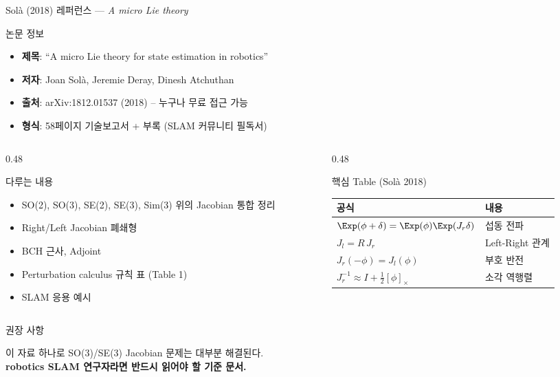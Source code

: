 \begin{frame}[shrink=25]{Solà (2018) 레퍼런스 --- \textit{A micro Lie theory}}
  \begin{block}{논문 정보}
    \begin{itemize}
      \item \textbf{제목}: ``A micro Lie theory for state estimation in robotics''
      \item \textbf{저자}: Joan Solà, Jeremie Deray, Dinesh Atchuthan
      \item \textbf{출처}: arXiv:1812.01537 (2018)  -- 누구나 무료 접근 가능
      \item \textbf{형식}: 58페이지 기술보고서 + 부록 (SLAM 커뮤니티 필독서)
    \end{itemize}
  \end{block}
  \pause
  \begin{columns}[T]
    \begin{column}{0.48\textwidth}
      \begin{block}{다루는 내용}
        \begin{itemize}
          \item SO(2), SO(3), SE(2), SE(3), Sim(3) 위의 Jacobian 통합 정리
          \item Right/Left Jacobian 폐쇄형
          \item BCH 근사, Adjoint
          \item Perturbation calculus 규칙 표 (Table 1)
          \item SLAM 응용 예시
        \end{itemize}
      \end{block}
    \end{column}
    \begin{column}{0.48\textwidth}
      \begin{alertblock}{핵심 Table (Solà 2018)}
        \footnotesize
        \begin{tabular}{ll}
          \hline
          공식 & 내용 \\
          \hline
          $\Exp(\phi+\delta) = \Exp(\phi)\Exp(J_r\delta)$ & 섭동 전파 \\
          $J_l = R\,J_r$ & Left-Right 관계 \\
          $J_r(-\phi) = J_l(\phi)$ & 부호 반전 \\
          $J_r^{-1} \approx I + \frac{1}{2}[\phi]_\times$ & 소각 역행렬 \\
          \hline
        \end{tabular}
      \end{alertblock}
    \end{column}
  \end{columns}
  \pause
  \vspace{0.3em}
  \begin{exampleblock}{권장 사항}
    \begin{center}
      이 자료 하나로 SO(3)/SE(3) Jacobian 문제는 대부분 해결된다.\\
      \textbf{robotics SLAM 연구자라면 반드시 읽어야 할 기준 문서.}
    \end{center}
  \end{exampleblock}
\end{frame}


